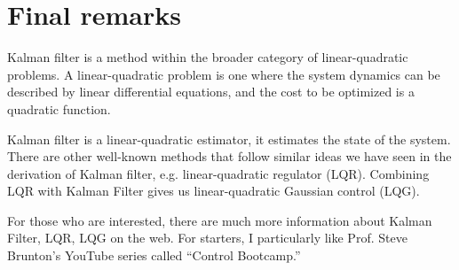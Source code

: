 \documentclass{article}
\renewcommand{\vec}[1]{\mathbf{#1}}
\newcommand{\vx}{\vec{x}}
\newcommand{\vw}{\vec{w}}
\newcommand{\vz}{\vec{z}}
\newcommand{\vv}{\vec{v}}
\newcommand{\vA}{\vec{A}}
\newcommand{\vB}{\vec{B}}
\newcommand{\vH}{\vec{H}}
\newcommand{\vQ}{\vec{Q}}
\newcommand{\vR}{\vec{R}}
\newcommand{\vL}{\vec{L}}
\newcommand{\vu}{\vec{u}}
\begin{document}
\section*{Final remarks}
Kalman filter is a method within the broader category of linear-quadratic problems. 
A linear-quadratic problem is one where the system dynamics can be described by linear differential equations,
and the cost to be optimized is a quadratic function. 

Kalman filter is a linear-quadratic estimator, it estimates the state of the system. There are other well-known methods that follow similar ideas we have seen in the
derivation of Kalman filter, e.g. linear-quadratic regulator (LQR). Combining LQR with Kalman Filter gives us linear-quadratic Gaussian control (LQG).
\iffalse
In a control system, an additional term represents that control $\vu$ is used to achieve a desired state, i.e.
\begin{equation}
\begin{aligned}
\vx_{k+1} &= \vA \vx_{k}  + \vB \vu_k + \vw_k\\
\vz_k &= \vH \vx_k + \vv_k
\end{aligned}
\end{equation}
Using a similar idea as the one we have just seen in Kalman filter, we can design the Linear-Quadratic Regulator (LQR) that gives the optimal control given quadratic cost. Suppose the control system terminate in $T$ time steps, we define the cost function to be minimized as 
\begin{equation}
\label{eq:J}
J = E \bigg( \vx^\mathsf{T}_L F \vx_L 
+ \sum_{k=0}^{T-1} ( \vx^\mathsf{T} _k \vQ_k \vx_k + \vu^\mathsf{T} _k \vR_k \vu_k ) \bigg)
\end{equation}
where I have abused notation to let $\vQ_k$ and $\vR_k$ denote prescribed state and control penalty matrices, to be more consistent with notations in the literature. The intuition behind these matrices $\vQ_k$ and $\vR_k$ is $\vQ_k$ is associated with the penalty we assign when the system misses the desired state, and $\vR_k$ is associated with the cost of actuation in the controls.

The control vector $\vu_k$ can be expressed as
$\vu_k = -\vL_k \hat{\vx}_k$, and we can minimize Eq.~\ref{eq:J} with respect to $\vL_k$, which is called a feedback gain matrix.
Using a Kalman filter to estimate the state of a system, then using LQR to build an optimal control in combination, is called Linear-Quadratic-Gaussian control\footnote{ The complete derivation of LQR is out of the scope in this tutorial. See sites e.g. wikipedia for more detail. Prof. Steve Brunton offers control Bootcamp on YouTube if this is something that interests you.}
\fi
For those who are interested, there are much more information about Kalman Filter, LQR, LQG on the web. For starters, I particularly like Prof. Steve Brunton's YouTube series called ``Control Bootcamp.''
\end{document}
